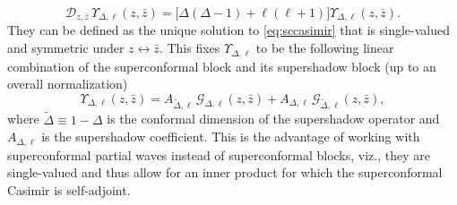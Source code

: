\documentclass[11pt]{article}
\newcommand{\zb}{\bar{z}}
\begin{document}
%
\begin{equation}\label{eq:sccasimir}
\mathcal{D}_{z,\zb}\,\Upsilon_{\Delta,\ell}(z,\zb) = \big[\Delta(\Delta-1)+\ell(\ell+1)\big]\Upsilon_{\Delta,\ell}(z,\zb).
\end{equation}
%
They can be defined as the unique solution to \eqref{eq:sccasimir} that is single-valued and symmetric under $z \leftrightarrow \zb$. This fixes $\Upsilon_{\Delta,\ell}$ to be the following linear combination of the superconformal block and its supershadow block (up to an overall normalization)
%
\begin{equation}\label{eq:scpw_scblock}
\Upsilon_{\Delta,\ell}(z,\zb) = A_{\widetilde{\Delta},\ell}\, \mathcal{G}_{\Delta,\ell}(z,\zb) + A_{\Delta,\ell} \, \mathcal{G}_{\widetilde{\Delta},\ell}(z,\zb),
\end{equation}
%
where $\widetilde{\Delta} \equiv 1-\Delta$ is the conformal dimension of the supershadow operator and $A_{\Delta,\ell}$ is the supershadow coefficient. This is the advantage of working with superconformal partial waves instead of superconformal blocks, viz., they are single-valued and thus allow for an inner product for which the superconformal Casimir is self-adjoint.
\end{document}

